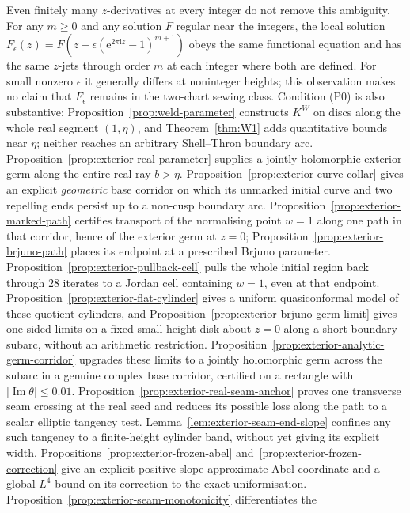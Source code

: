 \documentclass[11pt]{amsart}
\theoremstyle{definition}
\newcommand{\Kk}{K}
\newcommand{\eee}{\mathrm{e}}
\newcommand{\ii}{\mathrm{i}}
\begin{document}
Even finitely many $z$-derivatives at every integer do not remove this
ambiguity.  For any $m\ge0$ and any solution $F$ regular near the
integers, the local solution
$F_\epsilon(z)=F(z+\epsilon(\eee^{2\pi\ii z}-1)^{m+1})$ obeys the same
functional equation and has the same $z$-jets through order $m$ at
each integer where both are defined.  For small nonzero $\epsilon$ it
generally differs at noninteger heights; this observation makes no
claim that $F_\epsilon$ remains in the two-chart sewing class.
Condition (P0) is also substantive: Proposition~\ref{prop:weld-parameter}
constructs $\Kk^W$ on discs along the whole real segment $(1,\eta)$, and
Theorem~\ref{thm:W1} adds quantitative bounds near $\eta$; neither reaches
an arbitrary Shell--Thron boundary arc.  Proposition~\ref{prop:exterior-real-parameter} supplies a jointly
holomorphic exterior germ along the entire real ray $b>\eta$.
Proposition~\ref{prop:exterior-curve-collar} gives an explicit
\emph{geometric} base corridor on which its unmarked initial curve and
two repelling ends persist up to a non-cusp boundary arc.
Proposition~\ref{prop:exterior-marked-path} certifies transport of the
normalising point $w=1$ along one path in that corridor, hence of the
exterior germ at $z=0$; Proposition~\ref{prop:exterior-brjuno-path}
places its endpoint at a prescribed Brjuno parameter.
Proposition~\ref{prop:exterior-pullback-cell} pulls the whole initial
region back through $28$ iterates to a Jordan cell containing $w=1$,
even at that endpoint.
Proposition~\ref{prop:exterior-flat-cylinder} gives a uniform
quasiconformal model of these quotient cylinders, and
Proposition~\ref{prop:exterior-brjuno-germ-limit} gives one-sided
limits on a fixed small height disk about $z=0$ along a short
boundary subarc, without an arithmetic restriction.
Proposition~\ref{prop:exterior-analytic-germ-corridor} upgrades these
limits to a jointly holomorphic germ across the subarc in a genuine
complex base corridor, certified on a rectangle with
$|\operatorname{Im}\theta|\le0.01$.
Proposition~\ref{prop:exterior-real-seam-anchor} proves one transverse
seam crossing at the real seed and reduces its possible loss along
the path to a scalar elliptic tangency test.
Lemma~\ref{lem:exterior-seam-end-slope} confines any such tangency
to a finite-height cylinder band, without yet giving its explicit
width.
Propositions~\ref{prop:exterior-frozen-abel}
and~\ref{prop:exterior-frozen-correction} give an explicit
positive-slope approximate Abel coordinate and a global $L^4$
bound on its correction to the exact uniformisation.
Proposition~\ref{prop:exterior-seam-monotonicity} differentiates the
\end{document}

